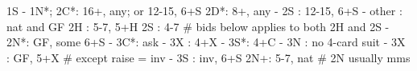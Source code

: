 1S - 1N*; 2C*: 16+, any; or 12-15, 6+S
2D*: 8+, any
   - 2S : 12-15, 6+S
   - other : nat and GF
2H : 5-7, 5+H
2S : 4-7
# bids below applies to both 2H and 2S
   - 2N*: GF, some 6+S
        - 3C*: ask
             - 3X : 4+X
             - 3S*: 4+C
             - 3N : no 4-card suit
   - 3X : GF, 5+X  # except raise = inv
   - 3S : inv, 6+S
2N+: 5-7, nat  # 2N usually mms